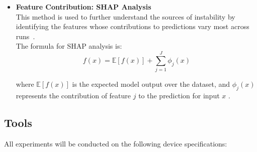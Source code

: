 \documentclass[12pt]{article}
\begin{document}
\begin{itemize}
  To operationalize MRIP, the following parameters will be defined:
  \begin{itemize}
    \item $\epsilon = 0.1$, representing the acceptable prediction error tolerance
    \item $\delta = 0.05$, representing the maximum perturbation radius
  \end{itemize}

  Perturbations $x_d^*$ will be generated by adding Gaussian noise to the input features: \[ x_d^* = x_d + \mathcal{N}(0, \sigma^2) \] 
  where $\sigma = 0.05 \cdot \text{std}(x)$, and values are clipped to remain within valid feature ranges.\\

  For each instance $x_d$, 50 perturbed samples will be generated, and MRIP will be estimated as the proportion of perturbed samples for which the prediction error satisfies: \[ |y_d - \hat{p}(x_d^*)| \le \epsilon \] where $ x_d $ is the original input for  defendant $ d $ , $ x_d^* $ is a perturbed version within the neighborhood $ B(x_d) $ , $ y_d^* \in \{0,1\} $ is the corresponding true outcome, $ \hat{p}(x_d^*) $ is the predicted probability, $ \epsilon $ is the acceptable error tolerance, and $ \delta $ controls the size of the neighborhood.

  \item \textbf{Feature Contribution: SHAP Analysis} \\
  \tab This method is used to further understand the sources of instability by identifying the features whose contributions to predictions vary most across runs~\cite{ponce2024practical}.\\

  The formula for SHAP analysis is:
  \[ f(x) = \mathbb{E}[f(x)] + \sum_{j=1}^{J} \phi_j(x) \]

  where $ \mathbb{E}[f(x)] $ is the expected model output over the dataset, and $ \phi_j(x) $ represents the contribution of feature $ j $ to the prediction for input $ x $ .
\end{itemize}

\subsection{Tools} 
All experiments will be conducted on the following device specifications:
\end{document}
